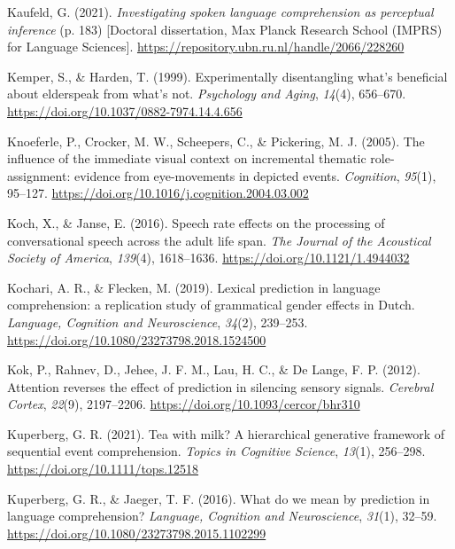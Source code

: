\documentclass[a4paper, nobind]{templates/ociamthesis}
\newlength{\cslhangindent}
\newenvironment{CSLReferences}[2] %
 {%
  \setlength{\parindent}{0pt}
  \ifodd #1
  \let\oldpar\par
  \def\par{\hangindent=\cslhangindent\oldpar}
  \fi
  \setlength{\parskip}{1mm}
  \setlength{\baselineskip}{6mm}
 }%
 {}
\begin{document}
\begin{CSLReferences}{1}{0}
\leavevmode{}%
Kaufeld, G. (2021). \emph{Investigating spoken language comprehension as perceptual inference} (p. 183) {[}Doctoral dissertation, Max Planck Research School (IMPRS) for Language Sciences{]}. \url{https://repository.ubn.ru.nl/handle/2066/228260}

\leavevmode{}%
Kemper, S., \& Harden, T. (1999). {Experimentally disentangling what's beneficial about elderspeak from what's not}. \emph{Psychology and Aging}, \emph{14}(4), 656--670. \url{https://doi.org/10.1037/0882-7974.14.4.656}

\leavevmode{}%
Knoeferle, P., Crocker, M. W., Scheepers, C., \& Pickering, M. J. (2005). The influence of the immediate visual context on incremental thematic role-assignment: evidence from eye-movements in depicted events. \emph{Cognition}, \emph{95}(1), 95--127. \url{https://doi.org/10.1016/j.cognition.2004.03.002}

\leavevmode{}%
Koch, X., \& Janse, E. (2016). {Speech rate effects on the processing of conversational speech across the adult life span}. \emph{The Journal of the Acoustical Society of America}, \emph{139}(4), 1618--1636. \url{https://doi.org/10.1121/1.4944032}

\leavevmode{}%
Kochari, A. R., \& Flecken, M. (2019). {Lexical prediction in language comprehension: a replication study of grammatical gender effects in Dutch}. \emph{Language, Cognition and Neuroscience}, \emph{34}(2), 239--253. \url{https://doi.org/10.1080/23273798.2018.1524500}

\leavevmode{}%
Kok, P., Rahnev, D., Jehee, J. F. M., Lau, H. C., \& De Lange, F. P. (2012). {Attention reverses the effect of prediction in silencing sensory signals}. \emph{Cerebral Cortex}, \emph{22}(9), 2197--2206. \url{https://doi.org/10.1093/cercor/bhr310}

\leavevmode{}%
Kuperberg, G. R. (2021). {Tea with milk? A hierarchical generative framework of sequential event comprehension}. \emph{Topics in Cognitive Science}, \emph{13}(1), 256--298. \url{https://doi.org/10.1111/tops.12518}

\leavevmode{}%
Kuperberg, G. R., \& Jaeger, T. F. (2016). What do we mean by prediction in language comprehension? \emph{Language, Cognition and Neuroscience}, \emph{31}(1), 32--59. \url{https://doi.org/10.1080/23273798.2015.1102299}


\end{CSLReferences}
\end{document}

